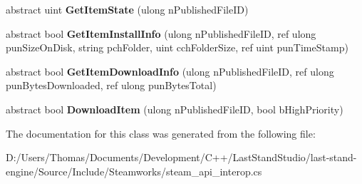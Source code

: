 \begin{DoxyCompactItemize}
\item 
\hypertarget{classValve_1_1Steamworks_1_1ISteamUGC_a1db97b2fc1e94014f36630d9e0f9b15a}{}abstract uint {\bfseries Get\+Item\+State} (ulong n\+Published\+File\+I\+D)\label{classValve_1_1Steamworks_1_1ISteamUGC_a1db97b2fc1e94014f36630d9e0f9b15a}

\item 
\hypertarget{classValve_1_1Steamworks_1_1ISteamUGC_a09960d6999d6b4bb4367aeb902034bea}{}abstract bool {\bfseries Get\+Item\+Install\+Info} (ulong n\+Published\+File\+I\+D, ref ulong pun\+Size\+On\+Disk, string pch\+Folder, uint cch\+Folder\+Size, ref uint pun\+Time\+Stamp)\label{classValve_1_1Steamworks_1_1ISteamUGC_a09960d6999d6b4bb4367aeb902034bea}

\item 
\hypertarget{classValve_1_1Steamworks_1_1ISteamUGC_ac5dac4c1b263437f4915385b864c7229}{}abstract bool {\bfseries Get\+Item\+Download\+Info} (ulong n\+Published\+File\+I\+D, ref ulong pun\+Bytes\+Downloaded, ref ulong pun\+Bytes\+Total)\label{classValve_1_1Steamworks_1_1ISteamUGC_ac5dac4c1b263437f4915385b864c7229}

\item 
\hypertarget{classValve_1_1Steamworks_1_1ISteamUGC_a5f42ab38efdec41a7ea6c02cbb03fb7d}{}abstract bool {\bfseries Download\+Item} (ulong n\+Published\+File\+I\+D, bool b\+High\+Priority)\label{classValve_1_1Steamworks_1_1ISteamUGC_a5f42ab38efdec41a7ea6c02cbb03fb7d}

\end{DoxyCompactItemize}


The documentation for this class was generated from the following file\+:\begin{DoxyCompactItemize}
\item 
D\+:/\+Users/\+Thomas/\+Documents/\+Development/\+C++/\+Last\+Stand\+Studio/last-\/stand-\/engine/\+Source/\+Include/\+Steamworks/steam\+\_\+api\+\_\+interop.\+cs\end{DoxyCompactItemize}
